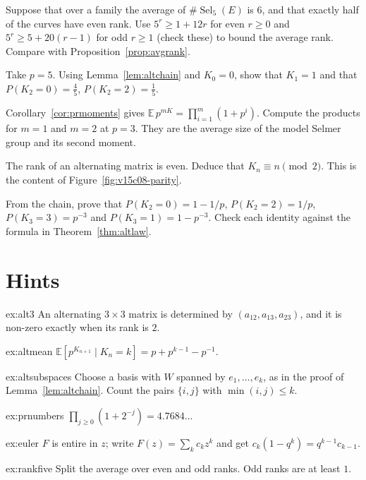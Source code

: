 \begin{exercise}[$\star$]\label{ex:rankfive}
Suppose that over a family the average of $\#\operatorname{Sel}_5(E)$ is $6$, and that exactly half of the curves have even rank. Use $5^r\ge1+12r$ for even $r\ge0$ and $5^r\ge5+20(r-1)$ for odd $r\ge1$ (check these) to bound the average rank. Compare with Proposition~\ref{prop:avgrank}.
\end{exercise}

\begin{exercise}[$\star$]\label{ex:v15-08-1}
Take \(p=5\). Using Lemma~\ref{lem:altchain} and \(K_0=0\), show that \(K_1=1\) and that \(P(K_2=0)=\tfrac45\), \(P(K_2=2)=\tfrac15\).
\end{exercise}

\begin{exercise}[$\star$]\label{ex:v15-08-2}
Corollary~\ref{cor:prmoments} gives \(\mathbb E\,p^{mK}=\prod_{i=1}^m(1+p^i)\). Compute the products for \(m=1\) and \(m=2\) at \(p=3\). They are the average size of the model Selmer group and its second moment.
\end{exercise}

\begin{exercise}[$\star$]\label{ex:v15-08-3}
The rank of an alternating matrix is even. Deduce that \(K_n\equiv n\pmod2\). This is the content of Figure~\ref{fig:v15c08-parity}.
\end{exercise}

\begin{exercise}[$\star\star\star$]\label{ex:v15-08-4}
From the chain, prove that \(P(K_2=0)=1-1/p\), \(P(K_2=2)=1/p\), \(P(K_3=3)=p^{-3}\) and \(P(K_3=1)=1-p^{-3}\). Check each identity against the formula in Theorem~\ref{thm:altlaw}.
\end{exercise}

\section{Hints}

\begin{hint}{ex:alt3}
An alternating $3\times3$ matrix is determined by $(a_{12},a_{13},a_{23})$, and it is non-zero exactly when its rank is $2$.
\end{hint}
\begin{hint}{ex:altmean}
$\mathbb E[p^{K_{n+1}}\mid K_n=k]=p+p^{k-1}-p^{-1}$.
\end{hint}
\begin{hint}{ex:altsubspaces}
Choose a basis with $W$ spanned by $e_1,\dots,e_k$, as in the proof of Lemma~\ref{lem:altchain}. Count the pairs $\{i,j\}$ with $\min(i,j)\le k$.
\end{hint}
\begin{hint}{ex:prnumbers}
$\prod_{j\ge0}(1+2^{-j})=4.7684\ldots$
\end{hint}
\begin{hint}{ex:euler}
$F$ is entire in $z$; write $F(z)=\sum_kc_kz^k$ and get $c_k(1-q^k)=q^{k-1}c_{k-1}$.
\end{hint}
\begin{hint}{ex:rankfive}
Split the average over even and odd ranks. Odd ranks are at least $1$.
\end{hint}

